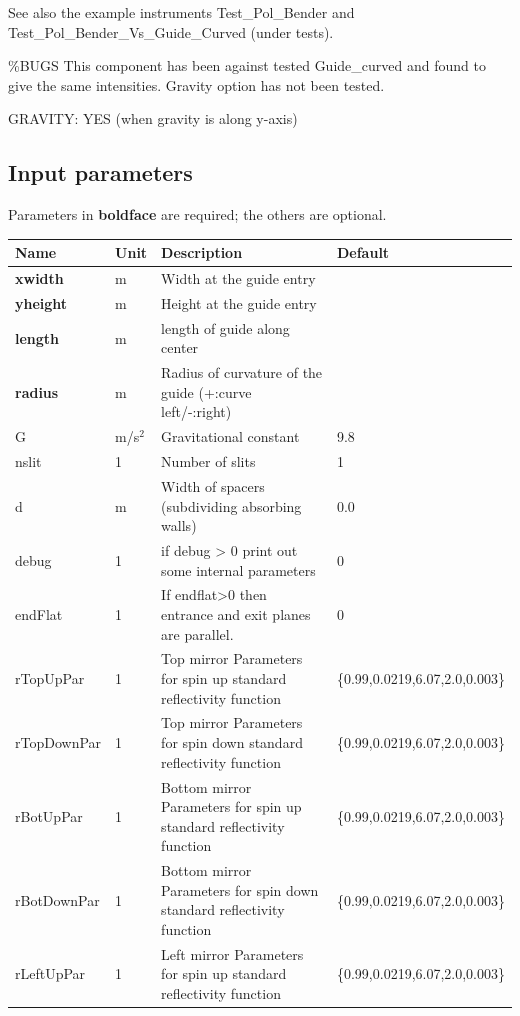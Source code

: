 See also the example instruments Test\_Pol\_Bender and Test\_Pol\_Bender\_Vs\_Guide\_Curved (under tests).

\%BUGS This component has been against tested Guide\_curved and found to give the same intensities. Gravity option has not been tested.

GRAVITY: YES (when gravity is along y-axis)

\subsection*{Input parameters}
Parameters in \textbf{boldface} are required; the others are optional.

\begin{longtable}{p{}p{}p{}p{}}
\toprule
\textbf{Name} & \textbf{Unit} & \textbf{Description} & \textbf{Default} \\
\midrule
\endhead
\textbf{xwidth} & m & Width at the guide entry &  \\
\textbf{yheight} & m & Height at the guide entry &  \\
\textbf{length} & m & length of guide along center &  \\
\textbf{radius} & m & Radius of curvature of the guide (+:curve left/-:right) &  \\
G & m/s$^{2}$ & Gravitational constant & 9.8 \\
nslit & 1 & Number of slits & 1 \\
d & m & Width of spacers (subdividing absorbing walls) & 0.0 \\
debug & 1 & if debug \textgreater{} 0 print out some internal parameters & 0 \\
endFlat & 1 & If endflat\textgreater{}0 then entrance and exit planes are parallel. & 0 \\
rTopUpPar & 1 & Top mirror Parameters for spin up standard reflectivity function & \{0.99,0.0219,6.07,2.0,0.003\} \\
rTopDownPar & 1 & Top mirror Parameters for spin down standard reflectivity function & \{0.99,0.0219,6.07,2.0,0.003\} \\
rBotUpPar & 1 & Bottom mirror Parameters for spin up standard reflectivity function & \{0.99,0.0219,6.07,2.0,0.003\} \\
rBotDownPar & 1 & Bottom mirror Parameters for spin down standard reflectivity function & \{0.99,0.0219,6.07,2.0,0.003\} \\
rLeftUpPar & 1 & Left mirror Parameters for spin up standard reflectivity function & \{0.99,0.0219,6.07,2.0,0.003\} \\

\end{longtable}
